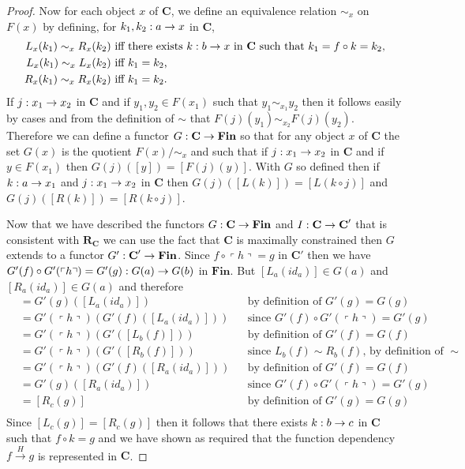 \documentclass[10pt,a4paper]{article}
\theoremstyle{remark}
\newcommand{\catc}[1][C]{\textbf{#1}}
\newcommand{\catcp}[1][C]{\textbf{#1}'}
\newcommand{\reqt}{\textbf{R}}
\newcommand{\reqtc}[1][\catc]{\reqt_{#1}}
\newcommand{\Fin}{\ensuremath{\textbf{Fin}} }
\newcommand{\fundep}[3]{#2 \xrightarrow{#1} #3}
\newcommand{\qq}[1]{
\left\ulcorner#1\right\urcorner
}
\begin{document}
\begin{proof}
Now for each object $x$ of $\catc$, we define an equivalence relation $\sim_x$ on $F(x)$ by defining,
for $k_1,k_2:a \rightarrow x$ in $\catc$,
\begin{align*}
L_x(k_1) \sim_x R_x(k_2) & \mbox{ iff there exists $k:b \morph x$ in $\catc$ such that $k_1 = f \circ k = k_2$,}\\
L_x(k_1) \sim_x L_x(k_2) & \mbox{ iff $k_1 = k_2$,} \\
R_x(k_1) \sim_x R_x(k_2) & \mbox{ iff $k_1 = k_2$.} \\
\end{align*}
If $j: x_1 \rightarrow x_2$ in $\catc$ and if $y_1,y_2 \in F(x_1)$ such that $y_1 \sim_{x_1} y_2$
then it follows easily by cases and from the definition of $\sim$ that $F(j)(y_1) \sim_{x_2} F(j)(y_2)$.
Therefore we can define a functor 
 $G: \catc \morph \Fin$  so that for any object $x$ of $\catc$
the set $G(x)$ is the quotient $F(x)/{\sim_x}$ and such that 
if $j: x_1 \rightarrow x_2$ in $\catc$ and if $y \in F(x_1)$ then $G(j)([y])=[F(j)(y)]$.
With $G$ so defined then if $k: a \rightarrow x_1$ and $j:x_1 \rightarrow x_2$ in $\catc$
then  $G(j)([L(k)])=[L(k \circ j)]$ and $G(j)([R(k)])=[R(k \circ j)]$. 

Now that we have described the functors  $G: \catc \morph \Fin$ and $I:\catc \morph \catcp$ that is consistent with $\reqtc$
we can use the fact that $\catc$ is maximally constrained then $G$ extends to a functor 
$G' : \catcp \morph \Fin$. Since $f \circ \qq{h} = g$ in $\catcp$ then we have
 $G'(f) \circ G'(\qq{h}) = G'(g): G(a) \morph G(b)$ in $\Fin$.
But $[L_a(id_a)] \in G(a)$ and $[R_a(id_a)] \in G(a)$ and therefore
\begin{align*}
[L_c(g)]&= G'(g)([L_a(id_a)])              & & \mbox{by definition of $G'(g)=G(g)$}           \\
        &= G'(\qq{h}) (G'(f)([L_a(id_a)])) & & \mbox{since $G'(f) \circ G'(\qq{h}) = G'(g)$}  \\
				&= G'(\qq{h}) (G'([L_b(f)]))       & & \mbox{by definition of $G'(f)=G(f)$}           \\
				&= G'(\qq{h}) (G'([R_b(f)]))       & & \mbox{since $L_b(f) \sim R_b(f)$, by definition of $\sim$} \\
				&= G'(\qq{h}) (G'(f)([R_a(id_a)])) & & \mbox{by definition of $G'(f)=G(f)$}           \\
		    &= G'(g)([R_a(id_a)])              & & \mbox{since $G'(f) \circ G'(\qq{h}) = G'(g)$}  \\
				&= [R_c(g)]                        & & \mbox{by definition of $G'(g)=G(g)$}           \\
\end{align*}
Since $[L_c(g)]=[R_c(g)]$ then it follows that there exists $k:b \rightarrow c$ in 
$\catc$ such that $f \circ k = g$ and we have shown as required that the function dependency
$\fundep{H}{f}{g}$ is represented in $\catc$.

\end{proof}
\end{document}

